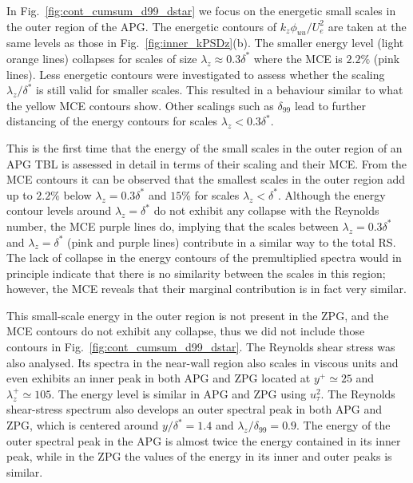 In Fig.~\ref{fig:cont_cumsum_d99_dstar} we focus on the energetic small scales in the outer region of the APG. The energetic contours of $k_z\phi_{uu}/U_e^2$ are taken at the same levels as those in Fig.~\ref{fig:inner_kPSDz}(b). The smaller energy level (light orange lines) collapses for scales of size $\lambda_z \approx 0.3 \delta^*$ where the MCE is $2.2\%$ (pink lines). 
Less energetic contours were investigated to assess whether the scaling $\lambda_z/\delta^*$ is still valid for smaller scales. This resulted in a behaviour similar to what the yellow MCE contours show. Other scalings such as $\delta_{99}$ lead to further distancing of the energy contours for scales $\lambda_z < 0.3\delta^*$.

This is the first time that the energy of the small scales in the outer region of an APG TBL is assessed in detail in terms of their scaling and their MCE.
From the MCE contours it can be observed that the smallest scales in the outer region add up to $2.2\%$ below $\lambda_z = 0.3 \delta^*$ and $15\%$ for scales $\lambda_z < \delta^*$.
Although the energy contour levels around $\lambda_z = \delta^*$ do not exhibit any collapse with the Reynolds number, the MCE purple lines do, implying that the scales between $\lambda_z = 0.3 \delta^*$ and $\lambda_z = \delta^*$ (pink and purple lines) contribute in a similar way to the total RS.
The lack of collapse in the energy contours of the premultiplied spectra would in principle indicate that there is no similarity between the scales in this region; however, the MCE reveals that their marginal contribution is in fact very similar.

This small-scale energy in the outer region is not present in the ZPG, and the MCE contours do not exhibit any collapse, thus we did not include those contours in Fig.~\ref{fig:cont_cumsum_d99_dstar}.
The Reynolds shear stress was also analysed. Its spectra in the near-wall region also scales in viscous units and even exhibits an inner peak in both APG and ZPG located at $y^+ \simeq 25$ and $\lambda_z^+ \simeq 105$. The energy level is similar in APG and ZPG using $u_{\tau}^2$. 
The Reynolds shear-stress spectrum also develops an outer spectral peak in both APG and ZPG, which is centered around $y/\delta^*=1.4$ and $\lambda_z/\delta_{99} = 0.9$. The energy of the outer spectral peak in the APG is almost twice the energy contained in its inner peak, while in the ZPG the values of the energy in its inner and outer peaks is similar.